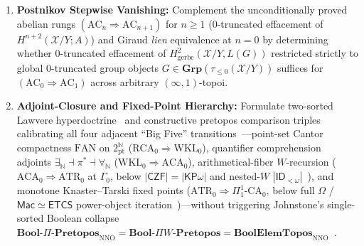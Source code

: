 \begin{enumerate}
  \item \textbf{Postnikov Stepwise Vanishing:} Complement the unconditionally proved abelian rungs $(\mathrm{AC}_n \Rightarrow \mathrm{AC}_{n+1})$ for $n \ge 1$ ($0$-truncated effacement of $H^{n+2}(\mathcal{X}/Y; A)$) and Giraud \emph{lien} equivalence at $n = 0$ by determining whether $0$-truncated effacement of $H^2_{\mathrm{gerbe}}(\mathcal{X}/Y, L(G))$ restricted strictly to global $0$-truncated group objects $G \in \mathbf{Grp}(\tau_{\le 0}(\mathcal{X}/Y))$ suffices for $(\mathrm{AC}_0 \Rightarrow \mathrm{AC}_1)$ across arbitrary $(\infty, 1)$-topoi.

  \item \textbf{Adjoint-Closure and Fixed-Point Hierarchy:} Formulate two-sorted Lawvere hyperdoctrine~\cite{Lawvere69} and constructive pretopos comparison triples calibrating all four adjacent ``Big Five'' transitions~\cite{Friedman75,Simpson09}---point-set Cantor compactness $\mathrm{FAN}$ on $2^{\mathbb{N}}_{\mathrm{pt}}$ ($\mathrm{RCA}_0 \Rightarrow \mathrm{WKL}_0$), quantifier comprehension adjoints $\exists_{\mathbb{N}} \dashv \pi^* \dashv \forall_{\mathbb{N}}$ ($\mathrm{WKL}_0 \Rightarrow \mathrm{ACA}_0$), arithmetical-fiber $W$-recursion ($\mathrm{ACA}_0 \Rightarrow \mathrm{ATR}_0$ at $\Gamma_0$, below $|\mathsf{CZF}| = |\mathsf{KP}\omega|$ and nested-$W$ $|\mathsf{ID}_{<\omega}|$~\cite{Aczel78}), and monotone Knaster--Tarski fixed points ($\mathrm{ATR}_0 \Rightarrow \Pi^1_1\text{-}\mathrm{CA}_0$, below full $\Omega$ / $\mathsf{Mac} \simeq \mathsf{ETCS}$ power-object iteration~\cite{Cole73,Maietti05})---without triggering Johnstone's single-sorted Boolean collapse $\mathbf{Bool}\text{-}\Pi\text{-}\mathbf{Pretopos}_{\mathrm{NNO}} = \mathbf{Bool}\text{-}\Pi W\text{-}\mathbf{Pretopos} = \mathbf{BoolElemTopos}_{\mathrm{NNO}}$~\cite[\S A2.1]{Johnstone02}.

\end{enumerate}


